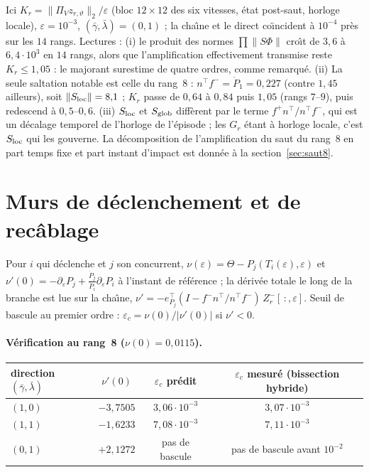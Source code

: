 \documentclass[11pt,a4paper]{article}
\theoremstyle{remark}
\newcommand{\norm}[1]{\lVert #1\rVert}
\newcommand{\vth}{\vartheta}
\begin{document}
Ici $K_r=\norm{\Pi_V z_{r,\vth}}_2/\varepsilon$ (bloc $12\times12$ des six vitesses, \'etat post-saut, horloge locale), $\varepsilon=10^{-3}$, $(\bar\gamma,\bar\lambda)=(0,1)$ ; la cha\^{\i}ne et le direct co\"{\i}ncident \`a $10^{-4}$ pr\`es sur les $14$ rangs. Lectures : (i) le produit des normes $\prod\lVert S\Phi\rVert$ cro\^{\i}t de $3{,}6$ \`a $6{,}4\cdot10^3$ en $14$ rangs, alors que l'amplification effectivement transmise reste $K_r\le1{,}05$ : le majorant surestime de quatre ordres, comme remarqu\'e. (ii) La seule saltation notable est celle du rang~8 : $n^\top f^-=\dot P_1=0{,}227$ (contre $1{,}45$ ailleurs), soit $\lVert S_{\rm loc}\rVert=8{,}1$ ; $K_r$ passe de $0{,}64$ \`a $0{,}84$ puis $1{,}05$ (rangs $7$--$9$), puis redescend \`a $0{,}5$--$0{,}6$. (iii) $S_{\rm loc}$ et $S_{\rm glob}$ diff\`erent par le terme $f^+n^\top/n^\top f^-$, qui est un d\'ecalage temporel de l'horloge de l'\'episode ; les $G_r$ \'etant \`a horloge locale, c'est $S_{\rm loc}$ qui les gouverne. La d\'ecomposition de l'amplification du saut du rang~8 en part \og temps fixe \fg{} et part \og instant d'impact \fg{} est donn\'ee \`a la section~\ref{sec:saut8}.

\section{Murs de d\'eclenchement et de recâblage}\label{sec:murs}
Pour $i$ qui d\'eclenche et $j$ son concurrent, $\nu(\varepsilon)=\Theta-P_j(T_i(\varepsilon),\varepsilon)$ et $\nu'(0)=-\partial_\varepsilon P_j+\frac{\dot P_j}{\dot P_i}\partial_\varepsilon P_i$ \`a l'instant de r\'ef\'erence ; la d\'eriv\'ee totale le long de la branche est lue sur la cha\^{\i}ne, $\nu'=-e_{P_j}^\top(I-f^-n^\top/n^\top f^-)\,Z_r^-[\,:,\varepsilon]$. Seuil de bascule au premier ordre : $\varepsilon_c=\nu(0)/\lvert\nu'(0)\rvert$ si $\nu'<0$.

\paragraph{V\'erification au rang~8 ($\nu(0)=0{,}0115$).}
\begin{center}\small
\begin{tabular}{lccc}
\toprule
direction $(\bar\gamma,\bar\lambda)$ & $\nu'(0)$ & $\varepsilon_c$ pr\'edit & $\varepsilon_c$ mesur\'e (bissection hybride)\\
\midrule
$(1,0)$ & $-3{,}7505$ & $3{,}06\cdot10^{-3}$ & $3{,}07\cdot10^{-3}$\\
$(1,1)$ & $-1{,}6233$ & $7{,}08\cdot10^{-3}$ & $7{,}11\cdot10^{-3}$\\
$(0,1)$ & $+2{,}1272$ & pas de bascule & pas de bascule avant $10^{-2}$\\
\bottomrule
\end{tabular}
\end{center}
\end{document}
